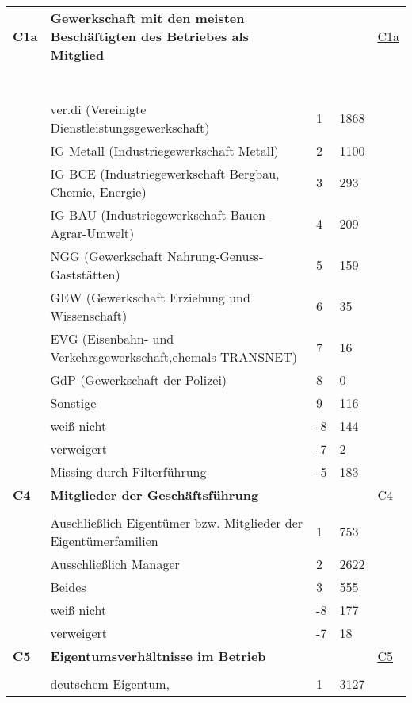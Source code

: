 \begin{longtable}{| L{2.5cm} | L{8.25cm}| C{1.5cm} | R{1.25cm} | C{2.25cm} |  }
   \midrule
\textbf{C1a}\label{var:suf:C1a} & \textbf{Gewerkschaft mit den meisten Beschäftigten des Betriebes als Mitglied} &  &  & \hyperref[C1a]{C1a} \\ 
   & \protect\subsection[Variablen C1a bis E2]{} &  &  &  \\ 
   & ver.di (Vereinigte Dienstleistungsgewerkschaft) & 1 & 1868 &  \\ 
   & IG Metall (Industriegewerkschaft Metall) & 2 & 1100 &  \\ 
   & IG BCE (Industriegewerkschaft Bergbau, Chemie, Energie) & 3 & 293 &  \\ 
   & IG BAU (Industriegewerkschaft Bauen-Agrar-Umwelt) & 4 & 209 &  \\ 
   & NGG (Gewerkschaft Nahrung-Genuss-Gaststätten) & 5 & 159 &  \\ 
   & GEW (Gewerkschaft Erziehung und Wissenschaft) & 6 & 35 &  \\ 
   & EVG (Eisenbahn- und Verkehrsgewerkschaft,ehemals TRANSNET) & 7 & 16 &  \\ 
   & GdP (Gewerkschaft der Polizei) & 8 & 0 &  \\ 
   & Sonstige & 9 & 116 &  \\ 
   & weiß nicht & -8 & 144 &  \\ 
   & verweigert & -7 & 2 &  \\ 
   & Missing durch Filterführung & -5 & 183 &  \\ 
   \midrule
\textbf{C4}\label{var:suf:C4} & \textbf{Mitglieder der Geschäftsführung} &  &  & \hyperref[C4]{C4} \\ 
   &  &  &  &  \\ 
   & Auschließlich Eigentümer bzw. Mitglieder der Eigentümerfamilien & 1 & 753 &  \\ 
   & Ausschließlich Manager & 2 & 2622 &  \\ 
   & Beides & 3 & 555 &  \\ 
   & weiß nicht & -8 & 177 &  \\ 
   & verweigert & -7 & 18 &  \\ 
   \midrule
\textbf{C5}\label{var:suf:C5} & \textbf{Eigentumsverhältnisse im Betrieb} &  &  & \hyperref[C5]{C5} \\ 
   &  &  &  &  \\ 
   & deutschem Eigentum, & 1 & 3127 &  \\ 

\end{longtable}
